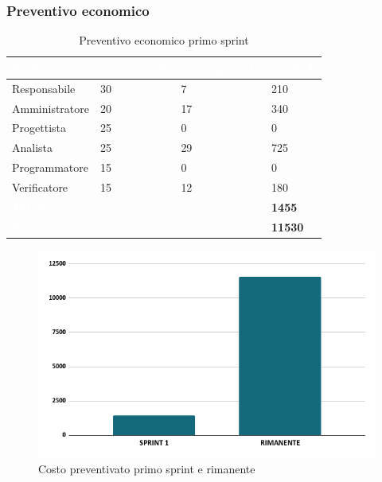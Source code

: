 \newpage

\subsubsection{Preventivo economico}

{
\setlength{\tabcolsep}{10pt}
\renewcommand{\arraystretch}{1.5}
\begin{table}[h]
    \centering
    \begin{tabularx}{\textwidth}{| l | l | l | X |}
        \hline
        \rowcolor{headerrow} \textbf{\textcolor{white}{Ruolo}} & \textbf{\textcolor{white}{Costo orario}} & \textbf{\textcolor{white}{Ore impiegate}} & \textbf{\textcolor{white}{Costo €}} \\
        \hline
        Responsabile & 30 & 7 & 210\\
        \hline
        Amministratore & 20 & 17  & 340\\
        \hline
        Progettista& 25 & 0  & 0\\
        \hline
        Analista & 25 & 29  & 725\\
        \hline
        Programmatore & 15 & 0  & 0\\
        \hline
        Verificatore & 15 & 12  & 180\\
        \hline
        \cellcolor{headerrow} \textbf{\textcolor{white}{Totale}} &  &  & \textbf{1455}\\
        \hline
        \cellcolor{headerrow} \textbf{\textcolor{white}{Rimanente}} &  &  & \textbf{11530}\\
        \hline
    \end{tabularx}
    \caption{Preventivo economico primo sprint}
    \label{tab:preventivocostiprimosprint}
\end{table}
}

\begin{figure}[h!]
    \centering
    \includegraphics[width=\textwidth]{prev1costo.png}
    \caption{Costo preventivato primo sprint e rimanente}
    \label{fig:preventivocostoprimosprint}
\end{figure}


